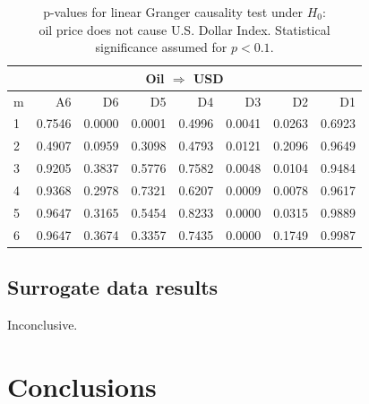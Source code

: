 \begin{table}
\begin{center}
\begin{tabular}{l|r r r r r r r}
\multicolumn{8}{c}{Oil $\Rightarrow$ USD}\\
\hline\hline
m & A6 & D6 & D5 & D4 & D3 & D2 & D1 \\
\hline
1 & 0.7546 & \cellcolor{mygreen}0.0000 & \cellcolor{mygreen}0.0001 & 0.4996 & \cellcolor{mygreen}0.0041 & \cellcolor{mygreen}0.0263 & 0.6923 \\
2 & 0.4907 & \cellcolor{mygreen!50}0.0959 & 0.3098 & 0.4793 & \cellcolor{mygreen}0.0121 & 0.2096 & 0.9649 \\
3 & 0.9205 & 0.3837 & 0.5776 & 0.7582 & \cellcolor{mygreen}0.0048 & \cellcolor{mygreen}0.0104 & 0.9484 \\
4 & 0.9368 & 0.2978 & 0.7321 & 0.6207 & \cellcolor{mygreen}0.0009 & \cellcolor{mygreen}0.0078 & 0.9617 \\
5 & 0.9647 & 0.3165 & 0.5454 & 0.8233 & \cellcolor{mygreen}0.0000 & \cellcolor{mygreen}0.0315 & 0.9889 \\
6 & 0.9647 & 0.3674 & 0.3357 & 0.7435 & \cellcolor{mygreen}0.0000 & 0.1749 & 0.9987 \\
\hline\hline
\end{tabular}
\caption{p-values for linear Granger causality test under $H_0$:\\
oil price does not cause U.S. Dollar Index. Statistical significance assumed for $p<0.1$.}
\end{center}
\end{table}

\subsection{Surrogate data results}
Inconclusive.

\section{Conclusions} \label{sec:conclusions}

